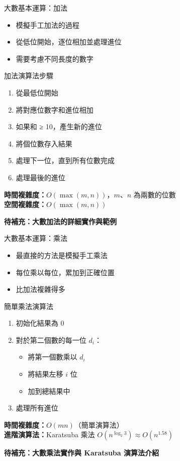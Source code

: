 \documentclass{beamer}
\begin{document}
\begin{frame}{大數基本運算：加法}
\begin{itemize}
    \item 模擬手工加法的過程
    \item 從低位開始，逐位相加並處理進位
    \item 需要考慮不同長度的數字
\end{itemize}

\vspace{1em}
\begin{block}{加法演算法步驟}
\begin{enumerate}
    \item 從最低位開始
    \item 將對應位數字和進位相加
    \item 如果和 ≥ 10，產生新的進位
    \item 將個位數存入結果
    \item 處理下一位，直到所有位數完成
    \item 處理最後的進位
\end{enumerate}
\end{block}

\vspace{1em}
\textbf{時間複雜度：}$O(\max(m, n))$，$m$、$n$ 為兩數的位數\\
\textbf{空間複雜度：}$O(\max(m, n))$

\vspace{1em}
\textbf{待補充：大數加法的詳細實作與範例}
\end{frame}

\begin{frame}{大數基本運算：乘法}
\begin{itemize}
    \item 最直接的方法是模擬手工乘法
    \item 每位乘以每位，累加到正確位置
    \item 比加法複雜得多
\end{itemize}

\vspace{1em}
\begin{block}{簡單乘法演算法}
\begin{enumerate}
    \item 初始化結果為 0
    \item 對於第二個數的每一位 $d_i$：
    \begin{itemize}
        \item 將第一個數乘以 $d_i$
        \item 將結果左移 $i$ 位
        \item 加到總結果中
    \end{itemize}
    \item 處理所有進位
\end{enumerate}
\end{block}

\vspace{1em}
\textbf{時間複雜度：}$O(mn)$（簡單演算法）\\
\textbf{進階演算法：}Karatsuba 乘法 $O(n^{\log_2 3}) \approx O(n^{1.58})$

\vspace{1em}
\textbf{待補充：大數乘法實作與 Karatsuba 演算法介紹}
\end{frame}
\end{document}

